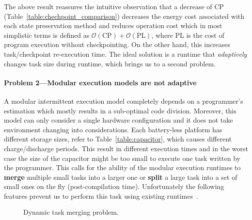 The above result reassures the intuitive observation that a decrease of CP (Table~\ref{table:chechpoint_comparison}) decreases the energy cost associated with each state preservation method and reduces operation cost which in most simplistic terms is defined as $\mathcal{O}(\text{CP})+\mathcal{O}(\text{PL})$, where PL is the cost of program execution without checkpointing. On the other hand, this increases task/checkpoint re-execution time. The ideal solution is a runtime that \emph{adaptively} changes task size during runtime, which brings us to a second problem.

\paragraph{Problem 2---Modular execution models are not adaptive}

A modular intermittent execution model completely depends on a programmer's estimation which mostly results in a sub-optimal code division. Moreover, this model can only consider a single hardware configuration and it does not take environment changing into considerations. Each battery-less platform has different storage sizes, refer to Table~\ref{table:capacitor}, which causes different charge/discharge periods. This result in different execution times and in the worst case the size of the capacitor might be too small to execute one task written by the programmer. This calls for the ability of the modular execution runtimes to \textbf{merge} multiple small tasks into a larger one or \textbf{split} a large task into a set of small ones on the fly (post-compilation time). Unfortunately the following features prevent us to perform this task using existing runtimes~\cite{chain,alpaca}.

\begin{figure}
	\centering
	\caption{Dynamic task merging problem.}
	\label{fig:DynamicChainSeq}
\end{figure}

